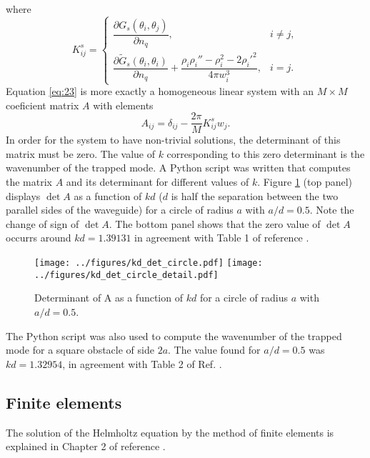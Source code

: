 \documentclass[11pt]{article}
\begin{document}
where
\begin{equation}
  \label{eq:24}
  K^s_{ij} =
\begin{cases}
\dfrac{\partial G_s(\theta_i,\theta_j)}{\partial n_q}, 
& i \ne j, \\[1em]
\dfrac{\partial \tilde{G}_s(\theta_i,\theta_i)}{\partial n_q} 
+ \dfrac{\rho_i \rho_i'' - \rho_i^2 - 2\rho_i'^2}{4\pi w_i^3}, 
& i = j .
\end{cases}
\end{equation}
Equation \eqref{eq:23} is more exactly a homogeneous linear system with an $M \times M$ coeficient matrix $A$ with elements
\begin{equation}
  \label{eq:25}
A_{ij} =  \delta_{ij} - \frac{2\pi}{M}K^s_{ij} w_j.
\end{equation}
In order for the system to have non-trivial solutions, the determinant of this matrix must be zero. The value of $k$ corresponding to this zero determinant is the wavenumber of the trapped mode. A Python script was written that computes the matrix $A$ and its determinant for different values of $k$. Figure \ref{fig:kd_det_circle} (top panel) displays $\det A$ as a function of $kd$ ($d$ is half the separation between the two parallel sides of the waveguide) for a circle of radius $a$ with $a/d=0.5$. Note the change of sign of $\det A$. The bottom panel shows that the zero value of $\det A$ occurrs around $kd = 1.39131$ in agreement with Table 1 of reference \cite{linton1992integral}.
\begin{figure}[h]
  \centering
  \texttt{[image: ../figures/kd\_det\_circle.pdf]}
  \texttt{[image: ../figures/kd\_det\_circle\_detail.pdf]}  
  \caption{\label{fig:kd_det_circle} Determinant of A as a function of $kd$ for a circle of radius $a$ with $a/d=0.5$.}
\end{figure}

The Python script was also used to compute the wavenumber of the trapped mode for a square obstacle of side $2a$. The value found for $a/d=0.5$ was $kd=1.32954$, in agreement with Table 2 of Ref. \cite{linton1992integral}.


\subsection{Finite elements}
The solution of the Helmholtz equation by the method of finite elements is explained in Chapter 2 of reference \cite{fahy2004advanced}.

\clearpage



 
\end{document}
